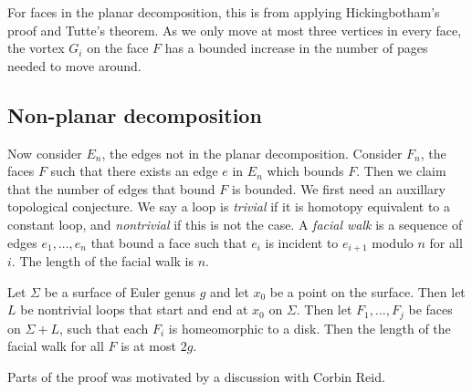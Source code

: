 For faces in the planar decomposition, this is from applying Hickingbotham's proof and Tutte's theorem. As we only move at most three vertices in every face, the vortex $G_i$ on the face $F$ has a bounded increase in the number of pages needed to move around. 

\subsection{Non-planar decomposition}
Now consider $E_n$, the edges not in the planar decomposition. Consider $F_n$, the faces $F$ such that there exists an edge $e$ in $E_n$ which bounds $F$. Then we claim that the number of edges that bound $F$ is bounded. We first need an auxillary topological conjecture. We say a loop is \textit{trivial} if it is homotopy equivalent to a constant loop, and \textit{nontrivial} if this is not the case. A \textit{facial walk} is a sequence of edges $e_1, ..., e_n$ that bound a face such that $e_i$ is incident to $e_{i + 1}$ modulo $n$ for all $i$. The length of the facial walk is $n$. 

\begin{lemma}
	Let $\Sigma$ be a surface of Euler genus $g$ and let $x_0$ be a point on the surface. Then let $L$ be nontrivial loops that start and end at $x_0$ on $\Sigma$. Then let $F_1, ..., F_j$ be faces on $\Sigma + L$, such that each $F_i$ is homeomorphic to a disk. Then the length of the facial walk for all $F$ is at most $2g$. 
\end{lemma}

Parts of the proof was motivated by a discussion with Corbin Reid. 

